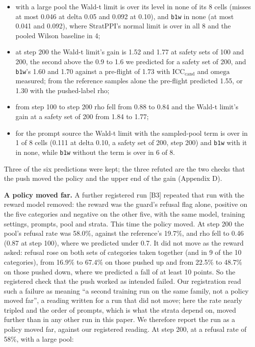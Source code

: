 \documentclass[11pt]{article}
\begin{document}
\begin{itemize}
\item with a large pool the Wald-t limit is over its level in none of its 8 cells (misses at most 0.046 at delta 0.05 and 0.092 at 0.10), and \texttt{b1w} in none (at most 0.041 and 0.092), where StratPPI's normal limit is over in all 8 and the pooled Wilson baseline in 4;
\item at step 200 the Wald-t limit's gain is 1.52 and 1.77 at safety sets of 100 and 200, the second above the 0.9 to 1.6 we predicted for a safety set of 200, and \texttt{b1w}'s 1.60 and 1.70 against a pre-flight of 1.73 with $\mathrm{ICC}_{\mathrm{cand}}$ and $\text{omega}$ measured; from the reference samples alone the pre-flight predicted 1.55, or 1.30 with the pushed-label rho;
\item from step 100 to step 200 rho fell from 0.88 to 0.84 and the Wald-t limit's gain at a safety set of 200 from 1.84 to 1.77;
\item for the prompt source the Wald-t limit with the sampled-pool term is over in 1 of 8 cells (0.111 at delta 0.10, a safety set of 200, step 200) and \texttt{b1w} with it in none, while \texttt{b1w} without the term is over in 6 of 8.
\end{itemize}

Three of the six predictions were kept; the three refuted are the two checks that the push moved the policy and the upper end of the gain (Appendix D).


\textbf{A policy moved far.} A further registered run [B3] repeated that run with the reward model removed: the reward was the guard's refusal flag alone, positive on the five categories and negative on the other five, with the same model, training settings, prompts, pool and strata. This time the policy moved. At step 200 the pool's refusal rate was 58.0\%, against the reference's 19.7\%, and rho fell to 0.46 (0.87 at step 100), where we predicted under 0.7. It did not move as the reward asked: refusal rose on both sets of categories taken together (and in 9 of the 10 categories), from 16.9\% to 67.4\% on those pushed up and from 22.5\% to 48.7\% on those pushed down, where we predicted a fall of at least 10 points. So the registered check that the push worked as intended failed. Our registration read such a failure as meaning ``a second training run on the same family, not a policy moved far'', a reading written for a run that did not move; here the rate nearly tripled and the order of prompts, which is what the strata depend on, moved further than in any other run in this paper. We therefore report the run as a policy moved far, against our registered reading. At step 200, at a refusal rate of 58\%, with a large pool:
\end{document}
